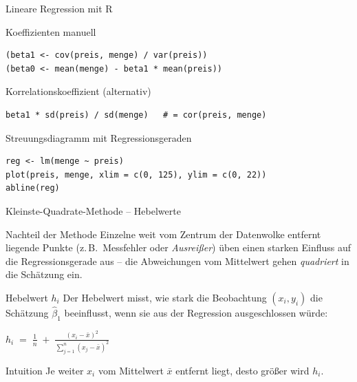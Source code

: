 \documentclass[aspectratio=169,11pt]{beamer}
\begin{document}
\begin{frame}[fragile]{Lineare Regression mit R}
  \begin{block}{Koeffizienten manuell}
\begin{lstlisting}
(beta1 <- cov(preis, menge) / var(preis))
(beta0 <- mean(menge) - beta1 * mean(preis))
\end{lstlisting}
  \end{block}

  \begin{block}{Korrelationskoeffizient (alternativ)}
\begin{lstlisting}
beta1 * sd(preis) / sd(menge)   # = cor(preis, menge)
\end{lstlisting}
  \end{block}

\begin{block}{Streuungsdiagramm mit Regressionsgeraden}
\begin{lstlisting}
reg <- lm(menge ~ preis)
plot(preis, menge, xlim = c(0, 125), ylim = c(0, 22))
abline(reg)
\end{lstlisting}
  \end{block}
\end{frame}

\begin{frame}{Kleinste-Quadrate-Methode -- Hebelwerte}
  \begin{alertblock}{Nachteil der Methode}
    Einzelne weit vom Zentrum der Datenwolke entfernt liegende Punkte
    (z.\,B.\ Messfehler oder \emph{Ausreißer}) üben einen starken
    Einfluss auf die Regressionsgerade aus -- die Abweichungen vom
    Mittelwert gehen \emph{quadriert} in die Schätzung ein.
  \end{alertblock}

  \begin{block}{Hebelwert $h_i$}
    Der Hebelwert misst, wie stark die Beobachtung $(x_i, y_i)$ die
    Schätzung $\hat{\beta}_1$ beeinflusst, wenn sie aus der Regression
    ausgeschlossen würde:
    \begin{center}
      $\displaystyle
        h_i \;=\; \frac{1}{n} \;+\;
        \frac{(x_i - \bar{x})^{2}}{\sum_{j=1}^{n}(x_j - \bar{x})^{2}}
      $
    \end{center}
  \end{block}

  \begin{exampleblock}{Intuition}
    Je weiter $x_i$ vom Mittelwert $\bar{x}$ entfernt liegt, desto
    größer wird $h_i$.
  \end{exampleblock}
\end{frame}
\end{document}
